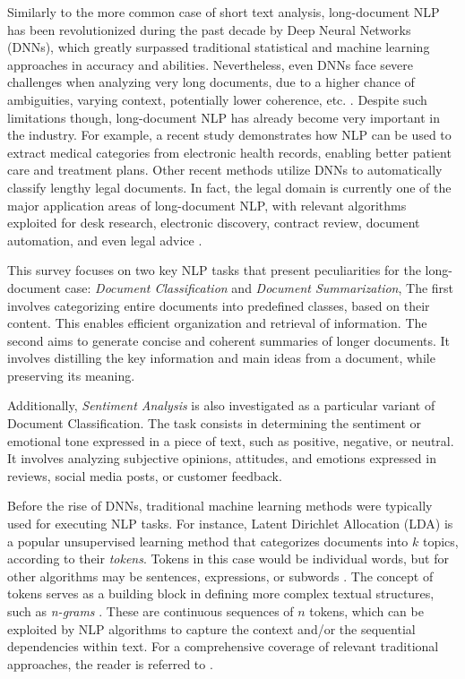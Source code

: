 \documentclass[preprint,review,12pt]{elsarticle}
\begin{document}
Similarly to the more common case of short text analysis, long-document NLP has been revolutionized during the past decade by Deep Neural Networks (DNNs), which greatly surpassed traditional statistical and machine learning approaches in accuracy and abilities. Nevertheless, even DNNs face severe challenges when analyzing very long documents, due to a higher chance of ambiguities, varying context, potentially lower coherence, etc. \cite{hold}. Despite such limitations though, long-document NLP has already become very important in the industry. For example, a recent study \cite{vithya} demonstrates how NLP can be used to extract medical categories from electronic health records, enabling better patient care and treatment plans. Other recent methods \cite{lulu} \cite{bambroo} utilize DNNs to automatically classify lengthy legal documents. In fact, the legal domain is currently one of the major application areas of long-document NLP, with relevant algorithms exploited for desk research, electronic discovery, contract review, document automation, and even legal advice \cite{dale}.

This survey focuses on two key NLP tasks that present peculiarities for the long-document case: \textit{Document Classification} and \textit{Document Summarization}, The first involves categorizing entire documents into predefined classes, based on their content. This enables efficient organization and retrieval of information. The second aims to generate concise and coherent summaries of longer documents. It involves distilling the key information and main ideas from a document, while preserving its meaning.

Additionally, \textit{Sentiment Analysis} is also investigated as a particular variant of Document Classification. The task consists in determining the sentiment or emotional tone expressed in a piece of text, such as positive, negative, or neutral. It involves analyzing subjective opinions, attitudes, and emotions expressed in reviews, social media posts, or customer feedback.

Before the rise of DNNs, traditional machine learning methods were typically used for executing NLP tasks. For instance, Latent Dirichlet Allocation (LDA) \cite{dirichet} is a popular unsupervised learning method that categorizes documents into $k$ topics, according to their \textit{tokens}. Tokens in this case would be individual words, but for other algorithms may be sentences, expressions, or subwords \cite{tokens}. The concept of tokens serves as a building block in defining more complex textual structures, such as \textit{n-grams} \cite{ngrams}. These are continuous sequences of $n$ tokens, which can be exploited by NLP algorithms to capture the context and/or the sequential dependencies within text. For a comprehensive coverage of relevant traditional approaches, the reader is referred to \citet{korde}.
\end{document}

